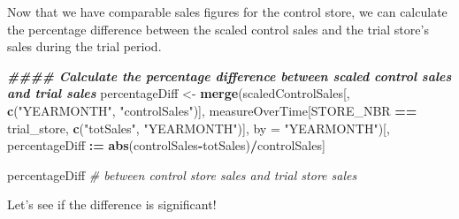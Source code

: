 \documentclass[
]{article}
\newenvironment{Shaded}{\begin{snugshade}}{\end{snugshade}}
\newcommand{\AttributeTok}[1]{\textcolor[rgb]{0.13,0.29,0.53}{#1}}
\newcommand{\CommentTok}[1]{\textcolor[rgb]{0.56,0.35,0.01}{\textit{#1}}}
\newcommand{\DocumentationTok}[1]{\textcolor[rgb]{0.56,0.35,0.01}{\textbf{\textit{#1}}}}
\newcommand{\FunctionTok}[1]{\textcolor[rgb]{0.13,0.29,0.53}{\textbf{#1}}}
\newcommand{\NormalTok}[1]{#1}
\newcommand{\OtherTok}[1]{\textcolor[rgb]{0.56,0.35,0.01}{#1}}
\newcommand{\SpecialCharTok}[1]{\textcolor[rgb]{0.81,0.36,0.00}{\textbf{#1}}}
\newcommand{\StringTok}[1]{\textcolor[rgb]{0.31,0.60,0.02}{#1}}
\begin{document}
Now that we have comparable sales figures for the control store, we can
calculate the percentage difference between the scaled control sales and
the trial store's sales during the trial period.

\begin{Shaded}
\begin{Highlighting}[]
\DocumentationTok{\#\#\#\# Calculate the percentage difference between scaled control sales and trial sales}
\NormalTok{percentageDiff }\OtherTok{\textless{}{-}} \FunctionTok{merge}\NormalTok{(scaledControlSales[, }\FunctionTok{c}\NormalTok{(}\StringTok{"YEARMONTH"}\NormalTok{, }\StringTok{"controlSales"}\NormalTok{)],}
\NormalTok{                        measureOverTime[STORE\_NBR }\SpecialCharTok{==}\NormalTok{ trial\_store, }\FunctionTok{c}\NormalTok{(}\StringTok{"totSales"}\NormalTok{, }\StringTok{"YEARMONTH"}\NormalTok{)],}
                        \AttributeTok{by =} \StringTok{"YEARMONTH"}\NormalTok{)[, percentageDiff }\SpecialCharTok{:=} \FunctionTok{abs}\NormalTok{(controlSales}\SpecialCharTok{{-}}\NormalTok{totSales)}\SpecialCharTok{/}\NormalTok{controlSales]}
\end{Highlighting}
\end{Shaded}

\begin{Shaded}
\begin{Highlighting}[]
\NormalTok{percentageDiff }\CommentTok{\# between control store sales and trial store sales}
\end{Highlighting}
\end{Shaded}

Let's see if the difference is significant!
\end{document}
